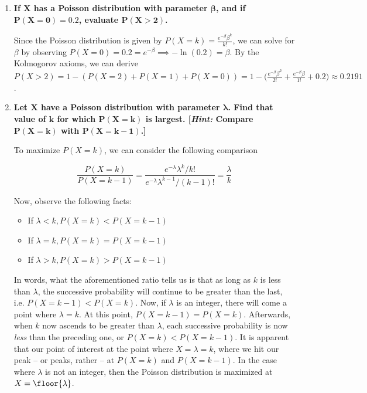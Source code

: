 \documentclass[10pt, oneside]{article}
\begin{document}
\begin{enumerate}[label=8.\arabic*]
\itemsep0em 
\item  \begin{tcolorbox}[
  colback=Cerulean!5!white,
  colframe=Cerulean!75!black]
\textbf{If $\bm{X}$ has a Poisson distribution with parameter $\bm{\beta}$, and if $\bm{P(X = 0) = 0.2}$, evaluate $\bm{P(X > 2)}$.}
\end{tcolorbox}

Since the Poisson distribution is given by $P(X = k) = \frac{e^{-\beta} \beta^k}{k!}$, we can solve for $\beta$ by observing $P(X = 0) = 0.2 = e^{-\beta} \implies -\ln(0.2) = \beta$. By the Kolmogorov axioms, we can derive $P(X > 2) = 1 - (P(X = 2) + P(X = 1) + P(X = 0)) = 1 - \Big( \frac{e^{-\beta} \beta^2}{2!} + \frac{e^{-\beta} \beta}{1!} + 0.2 \Big) \approx \boxed{0.2191}$.

\item  \begin{tcolorbox}[
  colback=Cerulean!5!white,
  colframe=Cerulean!75!black]
\textbf{Let $\bm{X}$ have a Poisson distribution with parameter $\bm{\lambda}$. Find that value of $\bm{k}$ for which $\bm{P(X = k)}$ is largest. [\textit{Hint:} Compare $\bm{P(X = k)}$ with $\bm{P(X = k - 1)}$.]}
\end{tcolorbox}

To maximize $P(X = k)$, we can consider the following comparison

\[ \frac{P(X = k)}{P(X = k - 1)} = \frac{e^{-\lambda} \lambda^k / k!}{ e^{-\lambda} \lambda^{k-1} / (k-1)!} = \frac{\lambda}{k}\]

Now, observe the following facts:

\begin{itemize}
\item If $\lambda < k, P(X = k) < P(X = k - 1)$
\item If $\lambda = k, P(X = k) = P(X = k - 1)$
\item If $\lambda > k, P(X = k) > P(X = k - 1)$
\end{itemize}

In words, what the aforementioned ratio tells us is that as long as $k$ is less than $\lambda$, the successive probability will continue to be greater than the last, i.e. $P(X = k -1) < P(X = k)$. Now, if $\lambda$ is an integer, there will come a point where $\lambda = k$. At this point, $P(X = k -1) = P(X = k)$. Afterwards, when $k$ now ascends to be greater than $\lambda$, each successive probability is now \textit{less} than the preceding one, or $P(X = k) < P(X = k - 1)$. It is apparent that our point of interest at the point where $\boxed{X = \lambda = k}$, where we hit our peak -- or peaks, rather -- at $P(X = k)$ and $P(X = k - 1)$. In the case where $\lambda$ is not an integer, then the Poisson distribution is maximized at $X = \floor{\lambda}$.


\end{enumerate}
\end{document}
